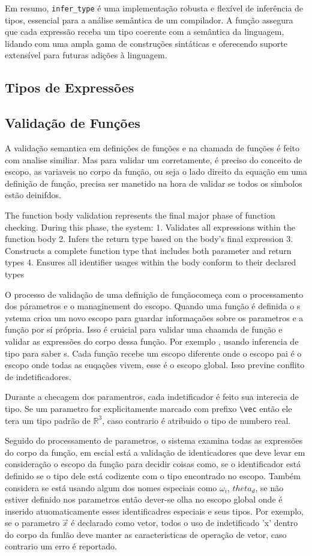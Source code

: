 Em resumo, \verb`infer_type` é uma implementação robusta e flexível de inferência de tipos, essencial para a análise semântica de um compilador. A função assegura que cada expressão receba um tipo coerente com a semântica da linguagem, lidando com uma ampla gama de construções sintáticas e oferecendo suporte extensível para futuras adições à linguagem.


\subsection{Tipos de Expressões}

\subsection{Validação de Funções}
A validação semantica em definições de funções e na chamada de funções é feito com analise similiar. Mas para validar um corretamente, é preciso do conceito de escopo, as variaveis no corpo da função, ou seja o lado direito da equação em uma definição de função, precisa ser manetido na hora de validar se todos os simbolos estão deinifdos.

The function body validation represents the final major phase of function checking. During this phase, the system:
1. Validates all expressions within the function body
2. Infers the return type based on the body's final expression
3. Constructs a complete function type that includes both parameter and return types
4. Ensures all identifier usages within the body conform to their declared types

O processo de validação de uma definição de funçãocomeça com o processamento dos párametros e o managinement do escopo. Quando uma função é definida o s ystema crioa um novo escopo para guardar informaçaões sobre os parametros e a função por sí própria. Isso é cruicial para validar uma chaamda de função e validar as expressões do corpo dessa função. Por exemplo , usando inferencia de tipo para saber s. Cada função recebe um escopo diferente onde o escopo pai é o escopo onde todas as euqações vivem, esse é o escopo global. Isso previne conflito de indetificadores.

Durante a checagem dos paramentros, cada indetificador é feito sua interecia de tipo. Se um parametro for explicitamente marcado com prefixo \verb`\vec`  então ele tera um tipo padrão de $\mathbb{R}^3$, caso contrario é atribuido o tipo de numbero real. 

Seguido do processamento de parametros, o sistema examina todas as expressões do corpo da função, em escial está a validação de identicadores que deve levar em consideração o escopo da função para decidir coisas como, se o identificador está definido se o tipo dele está codizente com o tipo encontrado no escopo. Também considera se está usando algum dos nomes especiais como $\omega_i$, $theta_d$, se não estiver definido nos parametros então dever-se olha no escopo global onde é inserido atuomaticamente esses identificadres especiais e seus tipos. Por exemplo, se o parametro $\vec{x}$ é declarado como vetor, todos o uso de indetificado 'x' dentro do corpo da funlão deve manter as caracteristicas de operação de vetor, caso contrario um erro é reportado.

